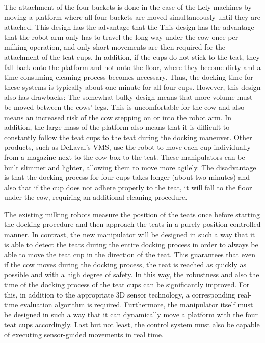 The attachment of the four buckets is done in the case of the Lely machines by moving a platform where all four buckets are moved simultaneously until they are attached. This design has the advantage that the
This design has the advantage that the robot arm only has to travel the long way under the cow once per milking operation, and only short movements are then required for the attachment of the teat cups. In addition, if the cups do not stick to the teat, they fall back onto the platform and not onto the floor, where they become dirty and a time-consuming cleaning process becomes necessary. Thus, the docking time for these systems is typically about one minute for all four cups. However, this design also has drawbacks: The somewhat bulky design means that more volume must be moved between the cows' legs. This is uncomfortable for the cow and also means an increased risk of the cow stepping on or into the robot arm. In addition, the large mass of the platform also means that it is difficult to constantly follow the teat cups to the teat during the docking maneuver. Other products, such as DeLaval's VMS, use the robot to move each cup individually from a magazine next to the cow box to the teat. These manipulators can be built slimmer and lighter, allowing them to move more agilely. The disadvantage is that the docking process for four cups takes longer (about two minutes) and also that if the cup does not adhere properly to the teat, it will fall to the floor under the cow, requiring an additional cleaning procedure.

The existing milking robots measure the position of the teats once before starting the docking procedure and then approach the teats in a purely position-controlled manner. In contrast, the new manipulator will be designed in such a way that it is able to detect the teats during the entire docking process in order to always be able to move the teat cup in the direction of the teat. This guarantees that even if the cow moves during the docking process, the teat is reached as quickly as possible and with a high degree of safety. In this way, the robustness and also the time of the docking process of the teat cups can be significantly improved. For this, in addition to the appropriate 3D sensor technology, a corresponding real-time evaluation algorithm is required. Furthermore, the manipulator itself must be designed in such a way that it can dynamically move a platform with the four teat cups accordingly. Last but not least, the control system must also be capable of executing sensor-guided movements in real time.

